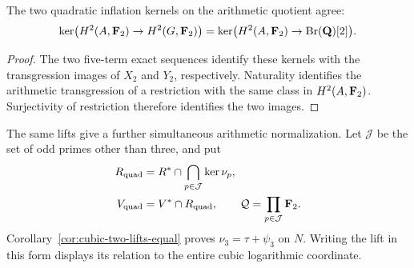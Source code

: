 \begin{corollary}\label{cor:full-quadratic-inflation-kernel}
The two quadratic inflation kernels on the arithmetic quotient agree:
\[
 \ker\bigl(H^2(A,\mathbf F_2)\to H^2(G,\mathbf F_2)\bigr)
 =\ker\bigl(H^2(A,\mathbf F_2)\to\operatorname{Br}(\mathbf Q)[2]\bigr).
\]
\end{corollary}
\begin{proof}
The two five-term exact sequences identify these kernels with the
transgression images of \(X_2\) and \(Y_2\), respectively.
Naturality identifies the arithmetic transgression of a restriction
with the same class in \(H^2(A,\mathbf F_2)\). Surjectivity of restriction
therefore identifies the two images.
\end{proof}

The same lifts give a further simultaneous arithmetic normalization.
Let \(\mathcal J\) be the set of odd primes other than three, and put
\[
 \begin{split}
 R_{\rm quad}&=R^*\cap\bigcap_{p\in\mathcal J}\ker\nu_p,\\
 V_{\rm quad}&=V^*\cap R_{\rm quad},\qquad
 \mathcal Q=\prod_{p\in\mathcal J}\mathbf F_2.
 \end{split}
\]
Corollary~\ref{cor:cubic-two-lifts-equal} proves
\(\nu_3=\tau+\psi_3\) on \(N\). Writing the lift in this
form displays its relation to the entire cubic logarithmic coordinate.

